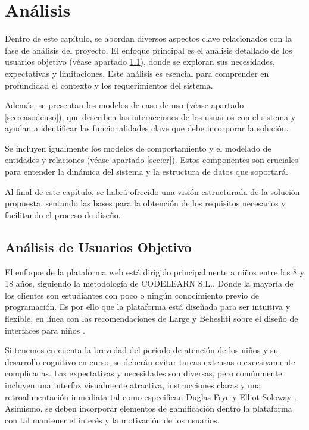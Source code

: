 \chapter{Análisis} \label{chap:analisis}

Dentro de este capítulo, se abordan diversos aspectos clave relacionados con la fase de análisis del proyecto. El enfoque principal es el análisis detallado de los usuarios objetivo (véase apartado \ref{sec:usuariosobjetivos}), donde se exploran sus necesidades, expectativas y limitaciones. Este análisis es esencial para comprender en profundidad el contexto y los requerimientos del sistema.

Además, se presentan los modelos de caso de uso (véase apartado \ref{sec:casodeuso}), que describen las interacciones de los usuarios con el sistema y ayudan a identificar las funcionalidades clave que debe incorporar la solución. 

Se incluyen igualmente los modelos de comportamiento y el modelado de entidades y relaciones (véase apartado \ref{sec:er}). Estos componentes son cruciales para entender la dinámica del sistema y la estructura de datos que soportará.

Al final de este capítulo, se habrá ofrecido una visión estructurada de la solución propuesta, sentando las bases para la obtención de los requisitos necesarios y facilitando el proceso de diseño.

\section{Análisis de Usuarios Objetivo} \label{sec:usuariosobjetivos}

El enfoque de la plataforma web está dirigido principalmente a niños entre los 8 y 18 años, siguiendo la metodología de CODELEARN S.L.. Donde la mayoría de los clientes son estudiantes con poco o ningún conocimiento previo de programación. Es por ello que la plataforma está diseñada para ser intuitiva y flexible, en línea con las recomendaciones de Large y Beheshti sobre el diseño de interfaces para niños \cite{large2005}.

Si tenemos en cuenta la brevedad del período de atención de los niños y su desarrollo cognitivo en curso, se deberán evitar tareas extensas o excesivamente complicadas. Las expectativas y necesidades son diversas, pero comúnmente incluyen una interfaz visualmente atractiva, instrucciones claras y una retroalimentación inmediata tal como especifican Duglas Frye y Elliot Soloway \cite{interfacedesign}. Asimismo, se deben incorporar elementos de gamificación dentro la plataforma con tal mantener el interés y la motivación de los usuarios. 

